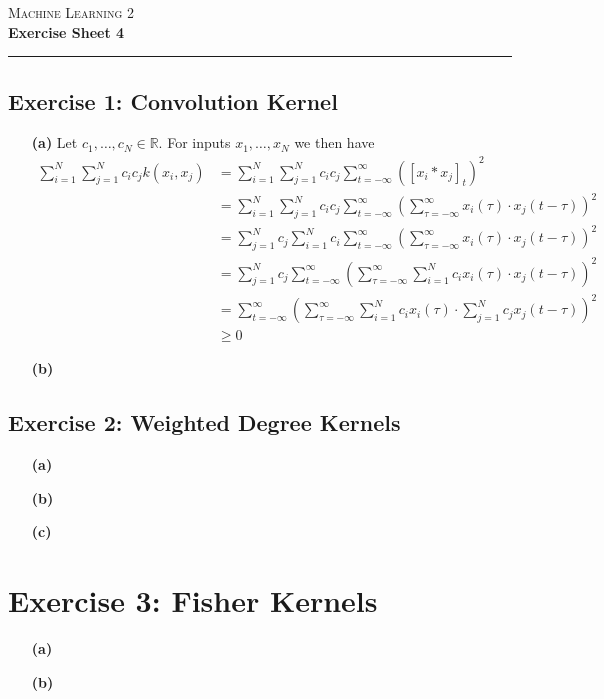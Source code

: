 \documentclass{article}
\newcommand{\real}{\mathbb{R}}
\begin{document}
\begin{center}
	\Huge \textsc{Machine Learning 2} \\
    \Large \textbf{Exercise Sheet 4}
\end{center}

\hrule

\subsection*{Exercise 1: Convolution Kernel} 
\begin{itemize}
\item[\textbf{(a)}]
Let $c_1, \dots, c_N \in \real$. For inputs $x_1,\dots,x_N$ we then have
\begin{align*}
\sum_{i=1}^{N} \sum_{j=1}^{N} c_i c_j k(x_i, x_j)
	&= \sum_{i=1}^{N} \sum_{j=1}^{N} c_i c_j \sum_{t=-\infty}^{\infty} \left( [ x_i * x_j ]_t \right)^2 \\
	&= \sum_{i=1}^{N} \sum_{j=1}^{N} c_i c_j \sum_{t=-\infty}^{\infty} \left( \sum_{\tau=-\infty}^{\infty} x_i(\tau) \cdot x_j(t - \tau) \right)^2 \\
	&= \sum_{j=1}^{N} c_j \sum_{i=1}^{N} c_i \sum_{t=-\infty}^{\infty} \left( \sum_{\tau=-\infty}^{\infty} x_i(\tau) \cdot x_j(t - \tau) \right)^2 \\
	&= \sum_{j=1}^{N} c_j \sum_{t=-\infty}^{\infty} \left( \sum_{\tau=-\infty}^{\infty} \sum_{i=1}^{N} c_i x_i(\tau) \cdot x_j(t - \tau) \right)^2 \\
	&= \sum_{t=-\infty}^{\infty} \left( \sum_{\tau=-\infty}^{\infty} \sum_{i=1}^{N} c_i x_i(\tau) \cdot \sum_{j=1}^{N} c_j x_j(t - \tau) \right)^2 \\
	&\geq 0
\end{align*}
\item[\textbf{(b)}]
\end{itemize}

\subsection*{Exercise 2: Weighted Degree Kernels} 
\begin{itemize}
\item[\textbf{(a)}]
\item[\textbf{(b)}]
\item[\textbf{(c)}]
\end{itemize}

\section*{Exercise 3: Fisher Kernels} 
\begin{itemize}
\item[\textbf{(a)}]
\item[\textbf{(b)}]
\end{itemize}
\end{document}
